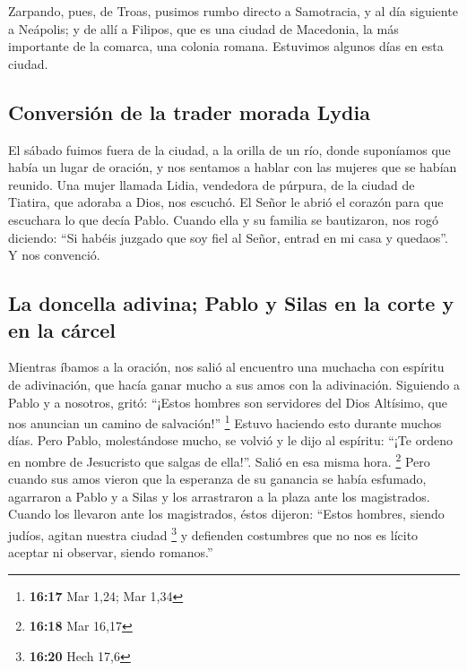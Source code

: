\begin{paracol}{2}
 Zarpando, pues, de Troas, pusimos rumbo directo a
Samotracia, y al día siguiente a Neápolis;  y de allí a
Filipos, que es una ciudad de Macedonia, la más importante de la
comarca, una colonia romana. Estuvimos algunos días en esta ciudad.

\hypertarget{conversiuxf3n-de-la-trader-morada-lydia}{%
\subsection{Conversión de la trader morada
Lydia}\label{conversiuxf3n-de-la-trader-morada-lydia}}

 El sábado fuimos fuera de la ciudad, a la orilla de un
río, donde suponíamos que había un lugar de oración, y nos sentamos a
hablar con las mujeres que se habían reunido.  Una mujer
llamada Lidia, vendedora de púrpura, de la ciudad de Tiatira, que
adoraba a Dios, nos escuchó. El Señor le abrió el corazón para que
escuchara lo que decía Pablo.  Cuando ella y su familia
se bautizaron, nos rogó diciendo: ``Si habéis juzgado que soy fiel al
Señor, entrad en mi casa y quedaos''. Y nos convenció.

\hypertarget{la-doncella-adivina-pablo-y-silas-en-la-corte-y-en-la-cuxe1rcel}{%
\subsection{La doncella adivina; Pablo y Silas en la corte y en la
cárcel}\label{la-doncella-adivina-pablo-y-silas-en-la-corte-y-en-la-cuxe1rcel}}

 Mientras íbamos a la oración, nos salió al encuentro una
muchacha con espíritu de adivinación, que hacía ganar mucho a sus amos
con la adivinación.  Siguiendo a Pablo y a nosotros,
gritó: ``¡Estos hombres son servidores del Dios Altísimo, que nos
anuncian un camino de salvación!'' \footnote{\textbf{16:17} Mar 1,24;
  Mar 1,34}  Estuvo haciendo esto durante muchos días.
Pero Pablo, molestándose mucho, se volvió y le dijo al espíritu: ``¡Te
ordeno en nombre de Jesucristo que salgas de ella!''. Salió en esa misma
hora. \footnote{\textbf{16:18} Mar 16,17}  Pero cuando
sus amos vieron que la esperanza de su ganancia se había esfumado,
agarraron a Pablo y a Silas y los arrastraron a la plaza ante los
magistrados.  Cuando los llevaron ante los magistrados,
éstos dijeron: ``Estos hombres, siendo judíos, agitan nuestra ciudad
\footnote{\textbf{16:20} Hech 17,6}  y defienden
costumbres que no nos es lícito aceptar ni observar, siendo romanos.''


\end{paracol}
